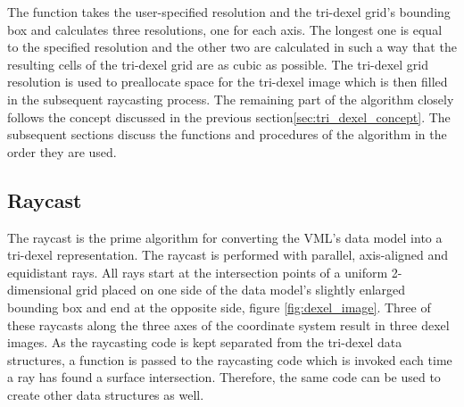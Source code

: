 The  function takes the user-specified resolution and the tri-dexel grid's bounding box and calculates three resolutions, one for each axis.
The longest one is equal to the specified resolution and the other two are calculated in such a way that the resulting cells of the tri-dexel grid are as cubic as possible.
The tri-dexel grid resolution is used to preallocate space for the tri-dexel image which is then filled in the subsequent raycasting process.
The remaining part of the algorithm closely follows the concept discussed in the previous section\ref{sec:tri_dexel_concept}.
The subsequent sections discuss the functions and procedures of the algorithm in the order they are used.


\subsection{Raycast}
\label{sec:tri_dexel_raycast}

The raycast is the prime algorithm for converting the VML's data model into a tri-dexel representation.
The raycast is performed with parallel, axis-aligned and equidistant rays.
All rays start at the intersection points of a uniform 2-dimensional grid placed on one side of the data model's slightly enlarged bounding box and end at the opposite side, \cf figure \ref{fig:dexel_image}.
Three of these raycasts along the three axes of the coordinate system result in three dexel images.
As the raycasting code is kept separated from the tri-dexel data structures, a function is passed to the raycasting code which is invoked each time a ray has found a surface intersection.
Therefore, the same code can be used to create other data structures as well. %

